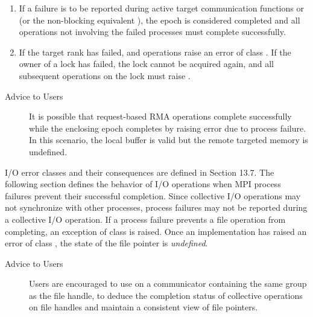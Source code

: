 \begin{enumerate}

    \item If a failure is to be reported during active target communication
        functions  or  (or the non-blocking
        equivalent ), the epoch is considered completed and all
        operations not involving the failed processes must complete
        successfully.

    \item If the target rank has failed,  and  
    	operations raise an error of class .
        If the owner of a lock has failed, the lock cannot be acquired again,
        and all subsequent operations on the lock must raise .

\end{enumerate}

\begin{description}

\item[Advice to Users] {It is possible that request-based RMA operations
complete successfully while the enclosing epoch completes by raising error due
to process failure.  In this scenario, the local buffer is valid but the
remote targeted memory is undefined.}

\end{description}

\label{sec:ft-notification:io}

I/O error classes and their consequences are defined in
Section 13.7. The following section
defines the behavior of I/O operations when MPI process failures prevent their
successful completion.
%
Since collective I/O operations may not synchronize with other processes,
process failures may not be reported during a collective I/O operation. If a
process failure prevents a file operation from completing, an \mpi exception of
class  is raised.
%
Once an \mpi implementation has raised an error of class
, the state of the file pointer is
\emph{undefined}.

\begin{description}
    
\item[Advice to Users]{Users are encouraged to use  on a communicator
containing the same group as the file handle, to deduce the completion status of
collective operations on file handles and maintain a consistent view of file
pointers.}

\end{description}

